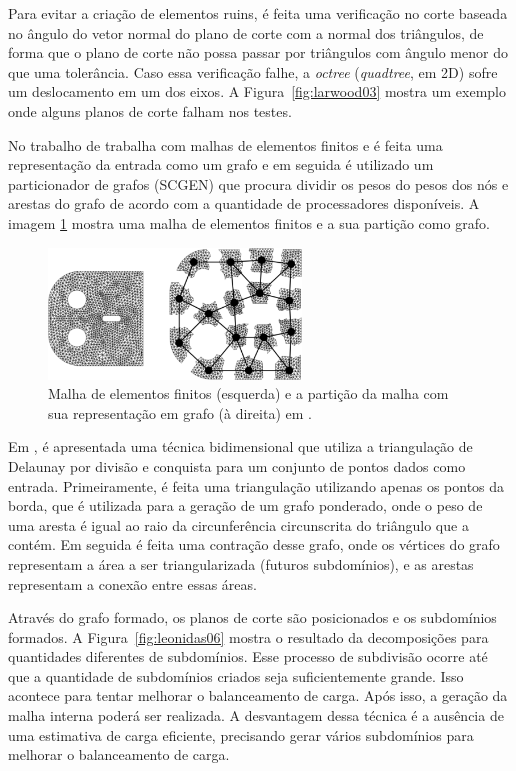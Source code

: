 Para evitar a criação de elementos ruins, é feita uma verificação no corte baseada no ângulo do vetor normal do plano de corte com a normal dos triângulos, de forma que o plano de corte não possa passar por triângulos com ângulo menor do que uma tolerância. Caso essa verificação falhe, a \textit{octree} (\textit{quadtree}, em 2D) sofre um deslocamento em um dos eixos. A Figura~\ref{fig:larwood03} mostra um exemplo onde alguns planos de corte falham nos testes. 

No trabalho de \cite{bib:CHARMPIS05} trabalha com malhas de elementos finitos e é feita uma representação da entrada  como um grafo e em seguida é utilizado um particionador de grafos (SCGEN) que procura dividir os pesos do pesos dos nós e arestas do grafo de acordo com a quantidade de processadores disponíveis. A imagem \ref{fig:dimos} mostra uma malha de elementos finitos e a sua partição como grafo.


\begin{figure}[htbp]
  \centering
  \includegraphics[width=0.6\textwidth]{fig/dimos.png}
   \caption{Malha de elementos finitos (esquerda) e a partição da malha com sua representação em grafo (à direita) em \cite{bib:CHARMPIS05}. }
  \label{fig:dimos}
\end{figure}


Em \cite{bib:Leonidas06}, é apresentada uma técnica bidimensional que utiliza a triangulação de Delaunay por divisão e conquista para um conjunto de pontos dados como entrada. Primeiramente, é feita uma triangulação utilizando apenas os pontos da borda, que é utilizada para a geração de um grafo ponderado, onde o peso de uma aresta é igual ao raio da circunferência circunscrita do triângulo que a contém. Em seguida é feita uma contração desse grafo, onde os vértices do grafo representam a área a ser triangularizada (futuros subdomínios), e as arestas representam a conexão entre essas áreas.
 
Através do grafo formado, os planos de corte são posicionados e os subdomínios formados. A Figura~\ref{fig:leonidas06} mostra o resultado da decomposições para quantidades diferentes de subdomínios. Esse processo de subdivisão ocorre até que a quantidade de subdomínios criados seja suficientemente grande. Isso acontece para tentar melhorar o balanceamento de carga. Após isso, a geração da malha interna poderá ser realizada. A desvantagem dessa técnica é a ausência de uma estimativa de carga eficiente, precisando gerar vários subdomínios para melhorar o balanceamento de carga.

